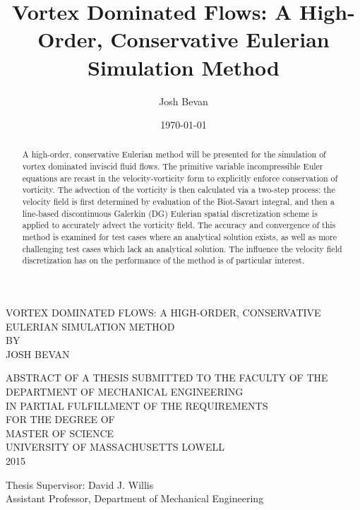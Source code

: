 \documentclass[letterpaper,12pt]{report}
\title{Vortex Dominated Flows: A High-Order, Conservative Eulerian Simulation Method}
\author{Josh Bevan}
\date{\today}
\begin{document}
\begin{center}
\setcounter{page}{2}
\large VORTEX DOMINATED FLOWS: A HIGH-ORDER, CONSERVATIVE EULERIAN SIMULATION METHOD\\
\vspace{1cm}\normalsize BY\\
\vspace{1cm}\normalsize JOSH BEVAN

\vspace{1cm} \normalsize ABSTRACT OF A THESIS SUBMITTED TO THE FACULTY OF THE\\
DEPARTMENT OF MECHANICAL ENGINEERING\\
IN PARTIAL FULFILLMENT OF THE REQUIREMENTS\\
FOR THE DEGREE OF\\
MASTER OF SCIENCE\\
UNIVERSITY OF MASSACHUSETTS LOWELL\\
2015\\
\end{center}
Thesis Supervisor: David J. Willis\\
Assistant Professor, Department of Mechanical Engineering

\begin{abstract}
\setcounter{page}{3}
\thispagestyle{plain} %
A high-order, conservative Eulerian method will be presented for the simulation of vortex dominated inviscid fluid flows. The primitive variable incompressible Euler equations are recast in the velocity-vorticity form to explicitly enforce conservation of vorticity. The advection of the vorticity is then calculated via a two-step process: the velocity field is first determined by evaluation of the Biot-Savart integral, and then a line-based discontinuous Galerkin (DG) Eulerian spatial discretization scheme is applied to accurately advect the vorticity field. The accuracy and convergence of this method is examined for test cases where an analytical solution exists, as well as more challenging test cases which lack an analytical solution. The influence the velocity field discretization has on the performance of the method is of particular interest.
\end{abstract}
\end{document}
